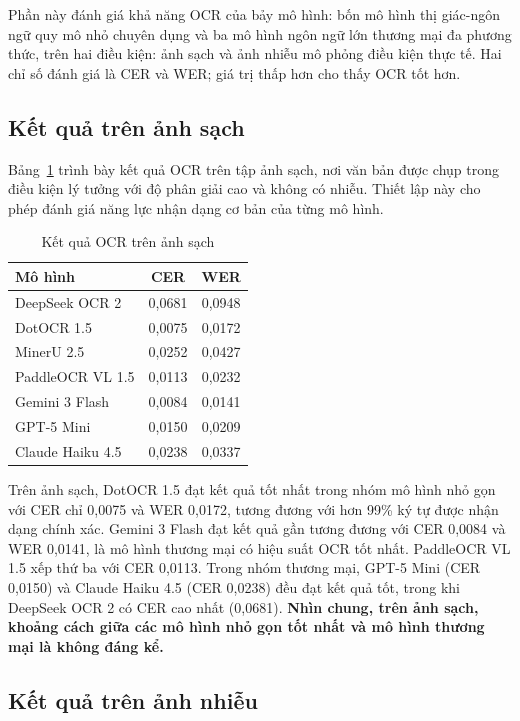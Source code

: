Phần này đánh giá khả năng OCR của bảy mô hình: bốn mô hình thị giác-ngôn ngữ quy mô nhỏ chuyên dụng và ba mô hình ngôn ngữ lớn thương mại đa phương thức, trên hai điều kiện: ảnh sạch và ảnh nhiễu mô phỏng điều kiện thực tế. Hai chỉ số đánh giá là CER và WER; giá trị thấp hơn cho thấy OCR tốt hơn.

\subsection{Kết quả trên ảnh sạch}

Bảng~\ref{tab:ocr_clean} trình bày kết quả OCR trên tập ảnh sạch, nơi văn bản được chụp trong điều kiện lý tưởng với độ phân giải cao và không có nhiễu. Thiết lập này cho phép đánh giá năng lực nhận dạng cơ bản của từng mô hình.

\begin{table}[htbp]
\centering
\caption{Kết quả OCR trên ảnh sạch}
\label{tab:ocr_clean}
\begin{tabular}{lcc}
\toprule
\textbf{Mô hình} & \textbf{CER} & \textbf{WER} \\
\midrule
DeepSeek OCR 2 & 0,0681 & 0,0948 \\
DotOCR 1.5 & 0,0075 & 0,0172 \\
MinerU 2.5 & 0,0252 & 0,0427 \\
PaddleOCR VL 1.5 & 0,0113 & 0,0232 \\
\midrule
Gemini 3 Flash & 0,0084 & 0,0141 \\
GPT-5 Mini & 0,0150 & 0,0209 \\
Claude Haiku 4.5 & 0,0238 & 0,0337 \\
\bottomrule
\end{tabular}
\end{table}

Trên ảnh sạch, DotOCR 1.5 đạt kết quả tốt nhất trong nhóm mô hình nhỏ gọn với CER chỉ 0,0075 và WER 0,0172, tương đương với hơn 99\% ký tự được nhận dạng chính xác. Gemini 3 Flash đạt kết quả gần tương đương với CER 0,0084 và WER 0,0141, là mô hình thương mại có hiệu suất OCR tốt nhất. PaddleOCR VL 1.5 xếp thứ ba với CER 0,0113. Trong nhóm thương mại, GPT-5 Mini (CER 0,0150) và Claude Haiku 4.5 (CER 0,0238) đều đạt kết quả tốt, trong khi DeepSeek OCR 2 có CER cao nhất (0,0681). \textbf{Nhìn chung, trên ảnh sạch, khoảng cách giữa các mô hình nhỏ gọn tốt nhất và mô hình thương mại là không đáng kể.}

\subsection{Kết quả trên ảnh nhiễu}


